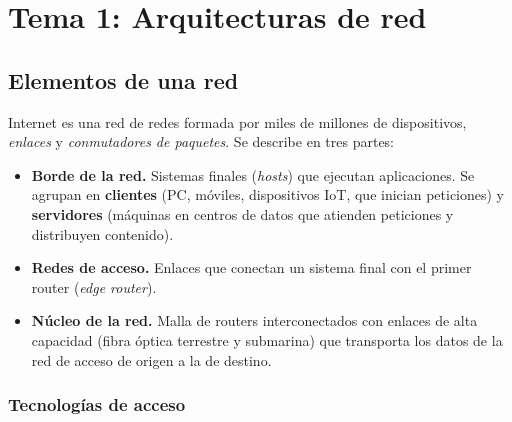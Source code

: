 \documentclass[11pt,a4paper]{article}
\begin{document}
\tableofcontents
\newpage

\section{Tema 1: Arquitecturas de red}

\subsection{Elementos de una red}

Internet es una red de redes formada por miles de millones de dispositivos, \emph{enlaces} y \emph{conmutadores de paquetes}. Se describe en tres partes:

\begin{itemize}
  \item \textbf{Borde de la red.} Sistemas finales (\emph{hosts}) que ejecutan aplicaciones. Se agrupan en \textbf{clientes} (PC, móviles, dispositivos IoT, que inician peticiones) y \textbf{servidores} (máquinas en centros de datos que atienden peticiones y distribuyen contenido).
  \item \textbf{Redes de acceso.} Enlaces que conectan un sistema final con el primer router (\emph{edge router}).
  \item \textbf{Núcleo de la red.} Malla de routers interconectados con enlaces de alta capacidad (fibra óptica terrestre y submarina) que transporta los datos de la red de acceso de origen a la de destino.
\end{itemize}

\subsubsection{Tecnologías de acceso}
\end{document}

